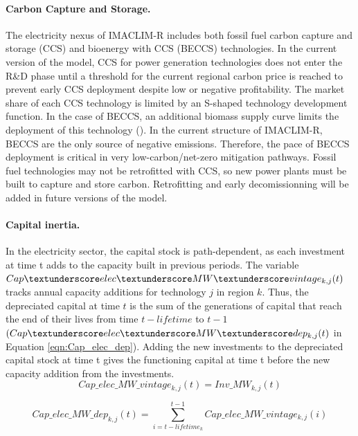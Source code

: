 \paragraph{Carbon Capture and Storage.}
The electricity nexus of IMACLIM-R includes both fossil fuel carbon capture and storage (CCS) and bioenergy with CCS (BECCS) technologies. In the current version of the model, CCS for power generation technologies does not enter the R\&D phase until a threshold for the current regional carbon price is reached to prevent early CCS deployment despite low or negative profitability. The market share of each CCS technology is limited by an S-shaped technology development function. In the case of BECCS, an additional biomass supply curve  limits the deployment of this technology (\cite{Hoogwijk2009}). In the current structure of IMACLIM-R, BECCS are the only source of negative emissions. Therefore, the pace of BECCS deployment is critical in very low-carbon/net-zero mitigation pathways. Fossil fuel technologies may not be retrofitted with CCS, so new power plants must be built to capture and store carbon. Retrofitting and early decomissionning will be added in future versions of the model.


\paragraph{Capital inertia.}
In the electricity sector, the capital stock is path-dependent, as each investment at time t adds to the capacity built in previous periods. The variable $Cap\textunderscore elec\textunderscore MW \textunderscore vintage_{k,j}(t)$ tracks annual capacity additions for technology $j$ in region $k$. Thus, the depreciated capital at time $t$ is the sum of the generations of capital that reach the end of their lives from time $t - lifetime$ to $t - 1$ $(Cap\textunderscore elec\textunderscore MW\textunderscore dep_{k,j}(t)$ in Equation \ref{eqn:Cap_elec_dep}). Adding the new investments to the depreciated capital stock at time t gives the functioning capital at time t before the new capacity addition from the investments.
\begin{dmath}
    Cap\_elec\_ MW\_vintage_{k,j}(t) = Inv\_MW_{k,j}(t)
    \label{eqn:Cap_elec_vintage}
\end{dmath}

\begin{dmath}
    Cap\_elec\_MW\_dep_{k,j}(t) = \sum_{i = t - lifetime_{k}}^{t-1}Cap\_elec\_MW\_vintage_{k,j}(i)
    \label{eqn:Cap_elec_dep}
\end{dmath}

